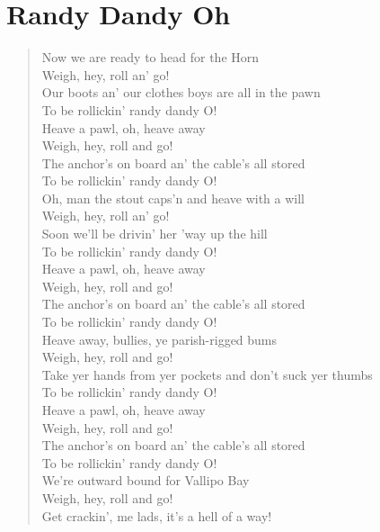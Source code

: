 \documentclass[11pt]{article}
\begin{document}
\section{Randy Dandy Oh}
\label{sec:org69c59ae}
\begin{verse}
Now we are ready to head for the Horn\\
Weigh, hey, roll an' go!\\
Our boots an' our clothes boys are all in the pawn\\
To be rollickin' randy dandy O!\\
\vspace*{1em}
Heave a pawl, oh, heave away\\
Weigh, hey, roll and go!\\
The anchor's on board an' the cable's all stored\\
To be rollickin' randy dandy O!\\
\vspace*{1em}
Oh, man the stout caps'n and heave with a will\\
Weigh, hey, roll an' go!\\
Soon we'll be drivin' her 'way up the hill\\
To be rollickin' randy dandy O!\\
Heave a pawl, oh, heave away\\
Weigh, hey, roll and go!\\
The anchor's on board an' the cable's all stored\\
To be rollickin' randy dandy O!\\
\vspace*{1em}
Heave away, bullies, ye parish-rigged bums\\
Weigh, hey, roll and go!\\
Take yer hands from yer pockets and don't suck yer thumbs\\
To be rollickin' randy dandy O!\\
\vspace*{1em}
Heave a pawl, oh, heave away\\
Weigh, hey, roll and go!\\
The anchor's on board an' the cable's all stored\\
To be rollickin' randy dandy O!\\
\vspace*{1em}
We're outward bound for Vallipo Bay\\
Weigh, hey, roll and go!\\
Get crackin', me lads, it's a hell of a way!\\

\end{verse}
\end{document}

